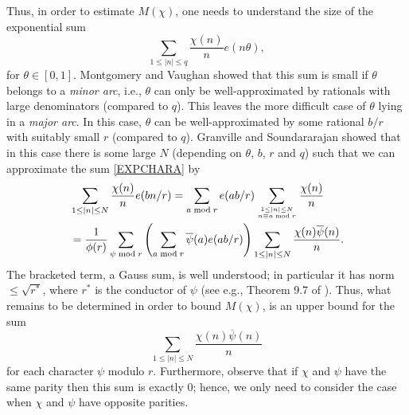 \documentclass[12pt]{amsart}
\theoremstyle{definition}
\numberwithin{equation}{section}
\newcommand{\mb}{\mathbb}
\newcommand{\ra}{\rightarrow}
\renewcommand{\bar}{\overline}
\begin{document}
Thus, in order to estimate $M(\chi)$, one needs to understand the size of the exponential sum
\begin{equation}\label{EXPCHARA}
\sum_{1\leq |n|\leq q} \frac{\chi(n)}{n}e(n\theta),
\end{equation}
for $\theta\in [0, 1]$. Montgomery and Vaughan \cite{MV2} showed that this sum is small if $\theta$ belongs to a \emph{minor arc}, i.e., $\theta$ can only be well-approximated by rationals with large denominators (compared to $q$). This leaves the more difficult case of $\theta$ lying in a \emph{major arc}. In this case, $\theta$ can be well-approximated by some rational $b/r$ with suitably small $r$ (compared to $q$). Granville and Soundararajan showed that in this case there is some large $N$ (depending on $\theta$, $b$, $r$ and $q$) such that we can approximate the sum 
\eqref{EXPCHARA} by 
\begin{align*}
&\sum_{1\leq |n| \leq N} \frac{\chi(n)}{n}e(bn/r) = \sum_{a\bmod r} e(ab/r) \sum_{1\leq |n| \leq N \atop n \equiv a \bmod r} \frac{\chi(n)}{n} \\
&=\frac{1}{\phi(r)} \sum_{\psi \bmod r} \left(\sum_{a\bmod r}\bar{\psi}(a)e(ab/r)\right) \sum_{1\leq |n| \leq N} \frac{\chi(n)\bar{\psi}(n)}{n}.
\end{align*}
The bracketed term, a Gauss sum, is well understood; in particular it has norm $\leq \sqrt{r^{\ast}}$, where $r^{\ast}$ is the conductor of $\psi$ (see e.g., Theorem 9.7 of \cite{MVbook}).   
Thus, what remains to be determined in order to bound $M(\chi)$, is an upper bound for the sum
\begin{equation}\label{LOGMEANPN}
\sum_{1\leq |n| \leq N} \frac{\chi(n)\bar{\psi}(n)}{n}
\end{equation}
for each character $\psi$ modulo $r$. Furthermore, observe that if $\chi$ and $\psi$ have the same parity then this sum is exactly $0$; hence, we only need to consider the case when $\chi$ and $\psi$ have opposite parities.
\end{document}
